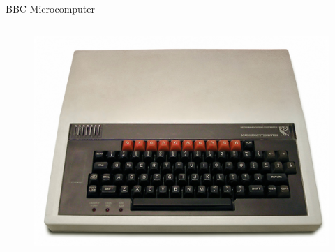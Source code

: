 \documentclass{beamer}
\begin{document}
  \begin{frame}{BBC Microcomputer}
    \begin{columns}
        \begin{figure}
          \includegraphics[scale=0.2]{images/bbc_micro}
        \end{figure}
    \end{columns}
  \end{frame}
\end{document}
